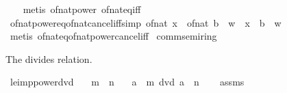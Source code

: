 \begin{isabellebody}
%
\isadelimproof
\ \ %
\endisadelimproof
%
\isatagproof
{}\isamarkupfalse%
\ {\isacharparenleft}{\kern0pt}metis\ of{\isacharunderscore}{\kern0pt}nat{\isacharunderscore}{\kern0pt}power\ of{\isacharunderscore}{\kern0pt}nat{\isacharunderscore}{\kern0pt}eq{\isacharunderscore}{\kern0pt}iff{\isacharparenright}{\kern0pt}%
\endisatagproof
{\isafoldproof}%
%
\isadelimproof
\isanewline
%
\endisadelimproof
\isanewline
{}\isamarkupfalse%
\ of{\isacharunderscore}{\kern0pt}nat{\isacharunderscore}{\kern0pt}power{\isacharunderscore}{\kern0pt}eq{\isacharunderscore}{\kern0pt}of{\isacharunderscore}{\kern0pt}nat{\isacharunderscore}{\kern0pt}cancel{\isacharunderscore}{\kern0pt}iff{\isacharbrackleft}{\kern0pt}simp{\isacharbrackright}{\kern0pt}{\isacharcolon}{\kern0pt}\ {\isachardoublequoteopen}of{\isacharunderscore}{\kern0pt}nat\ x\ {\isacharequal}{\kern0pt}\ {\isacharparenleft}{\kern0pt}of{\isacharunderscore}{\kern0pt}nat\ b{\isacharparenright}{\kern0pt}\ {\isacharcircum}{\kern0pt}\ w\ {\isasymlongleftrightarrow}\ x\ {\isacharequal}{\kern0pt}\ b\ {\isacharcircum}{\kern0pt}\ w{\isachardoublequoteclose}\isanewline
%
\isadelimproof
\ \ %
\endisadelimproof
%
\isatagproof
{}\isamarkupfalse%
\ {\isacharparenleft}{\kern0pt}metis\ of{\isacharunderscore}{\kern0pt}nat{\isacharunderscore}{\kern0pt}eq{\isacharunderscore}{\kern0pt}of{\isacharunderscore}{\kern0pt}nat{\isacharunderscore}{\kern0pt}power{\isacharunderscore}{\kern0pt}cancel{\isacharunderscore}{\kern0pt}iff{\isacharparenright}{\kern0pt}%
\endisatagproof
{\isafoldproof}%
%
\isadelimproof
\isanewline
%
\endisadelimproof
\isanewline
{}\isamarkupfalse%
\isanewline
\isanewline
{}\isamarkupfalse%
\ comm{\isacharunderscore}{\kern0pt}semiring{\isacharunderscore}{\kern0pt}{}\isanewline
{}%
\begin{isamarkuptext}%
The divides relation.%
\end{isamarkuptext}\isamarkuptrue%
\isamarkupfalse%
\ le{\isacharunderscore}{\kern0pt}imp{\isacharunderscore}{\kern0pt}power{\isacharunderscore}{\kern0pt}dvd{\isacharcolon}{\kern0pt}\isanewline
\ \ \ {\isachardoublequoteopen}m\ {\isasymle}\ n{\isachardoublequoteclose}\isanewline
\ \ \ {\isachardoublequoteopen}a\ {\isacharcircum}{\kern0pt}\ m\ dvd\ a\ {\isacharcircum}{\kern0pt}\ n{\isachardoublequoteclose}\isanewline
%
\isadelimproof
%
\endisadelimproof
%
\isatagproof
{}\isamarkupfalse%
\isanewline
\ \ \isamarkupfalse%
\ assms\ \isamarkupfalse%

\end{isabellebody}
